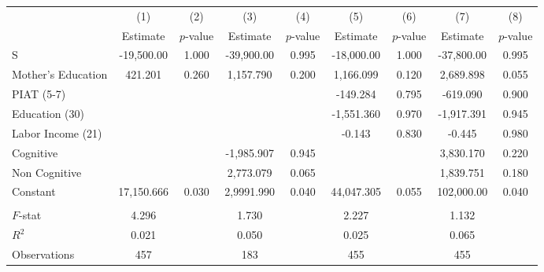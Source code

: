 \begin{tabular}{lcccccccc} \toprule
 & (1) & (2) & (3) & (4) & (5) & (6) & (7) & (8) \\ 
 & Estimate  & $p$-value  & Estimate  & $p$-value  & Estimate  & $p$-value  & Estimate  & $p$-value  \\  \midrule
S & -19,500.00 &     1.000 & -39,900.00 &     0.995 & -18,000.00 &     1.000 & -37,800.00 &     0.995 \\  
Mother's Education &   421.201 &     0.260 &  1,157.790 &     0.200 &  1,166.099 &     0.120 &  2,689.898 &     0.055 \\  
PIAT (5-7) &         &         &         &         &  -149.284 &     0.795 &  -619.090 &     0.900 \\  
Education (30) &         &         &         &         & -1,551.360 &     0.970 & -1,917.391 &     0.945 \\  
Labor Income (21) &         &         &         &         &    -0.143 &     0.830 &    -0.445 &     0.980 \\  
Cognitive &         &         & -1,985.907 &     0.945 &         &         &  3,830.170 &     0.220 \\  
Non Cognitive &         &         &  2,773.079 &     0.065 &         &         &  1,839.751 &     0.180 \\  
Constant & 17,150.666 &     0.030 & 2,9991.990 &     0.040 & 44,047.305 &     0.055 &  102,000.00 &     0.040 \\  \\ \midrule
$F$-stat &     4.296 &         &     1.730 &         &     2.227 &         &     1.132 &        \\  
$R^2$ &     0.021 &         &     0.050 &         &     0.025 &         &     0.065 &        \\  
Observations &   457 &         &   183 &         &   455 &         &   455 &        \\  
\bottomrule \end{tabular}
